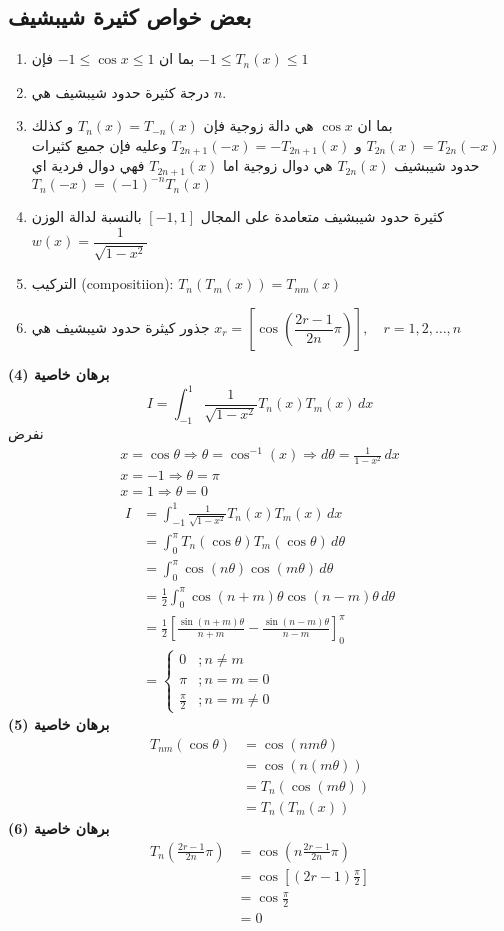 \subsection*{بعض خواص كثيرة شيبشيف}
\begin{enumerate}
	\item بما ان $-1\leq\cos x\leq 1$ فإن $-1\leq T_n(x) \leq 1$
	\item درجة كثيرة حدود شيبشيف هي $n$.
	\item بما ان $\cos x$ هي دالة زوجية فإن $T_n(x) = T_{-n}(x) $ و كذلك $T_{2n}(x) = T_{2n}(-x)$ و $T_{2n+1}(-x) = -T_{2n+1}(x)$ وعليه فإن جميع كثيرات حدود شيبشيف $T_{2n}(x)$ هي دوال زوجية اما $T_{2n+1}(x)$ فهي دوال فردية اي $T_{n}(-x) = (-1)^{-n}T_n(x)$
	\item كثيرة حدود شيبشيف متعامدة على المجال $[-1,1]$ بالنسبة لدالة الوزن $w(x) = \dfrac{1}{\sqrt{1-x^2}}$
	\item التركيب (compositiion): $T_n(T_m(x)) = T_{nm}(x)$
	\item جذور كيثرة حدود شيبشيف هي \quad$x_r = \left[\cos\left(\dfrac{2r-1}{2n}\pi\right)\right], \quad r = 1,2,\dots,n$
\end{enumerate}
\textbf{برهان خاصية (4)}
\[
I = \int_{-1}^{1} \frac{1}{\sqrt{1-x^2}} T_n(x)T_m(x) \,dx
\]
نفرض
\begin{gather*}
	x = \cos\theta \Rightarrow \theta = \cos^{-1}(x) \Rightarrow d\theta = \frac{1}{1-x^2}\,dx\\
	x=-1 \Rightarrow \theta = \pi\\
	x=1 \Rightarrow \theta = 0
\end{gather*}
\begin{align*}
	I &= \int_{-1}^{1} \frac{1}{\sqrt{1-x^2}} T_n(x)T_m(x) \,dx \\[5pt]
	&= \int_0^\pi T_n(\cos\theta) T_m(\cos\theta) \, d\theta\\[5pt]
	&= \int_0^\pi \cos(n\theta) \cos(m\theta) \, d\theta\\[5pt]
	&=\frac{1}{2} \int_0^\pi \cos(n+m)\theta \cos(n-m)\theta \, d\theta\\[5pt]
	&= \frac{1}{2} \left[\frac{\sin(n+m)\theta}{n+m} - \frac{\sin(n-m)\theta}{n-m}\right]_0^{\pi}\\[5pt]
	&= \begin{cases}
		0 & ;n\neq m \\
		\pi & ;n=m=0\\
		\frac{\pi}{2} &; n=m\neq0
	\end{cases}
\end{align*}
\newpage\noindent
\textbf{برهان خاصية (5)}
\begin{align*}
T_{nm}(\cos \theta) &= \cos(nm\theta) \\
&= \cos(n(m\theta))\\
&= T_n(\cos(m\theta))\\
&= T_n(T_m(x))
\end{align*}
\textbf{برهان خاصية (6)}
\begin{align*}
	T_n\left(\frac{2r-1}{2n} \pi\right) &= \cos\left(n\frac{2r-1}{2n}\pi\right)\\
	&= \cos\left[(2r-1)\frac{\pi}{2}\right]\\
	&= \cos\frac{\pi}{2}\\ &=0
\end{align*}